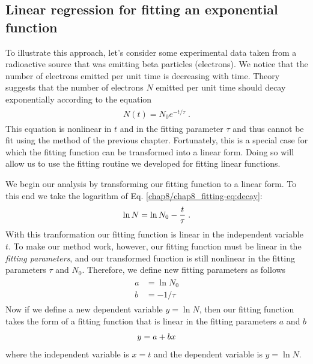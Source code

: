 \documentclass[letterpaper,10pt,english]{sphinxmanual}
\begin{document}
\subsection{Linear regression for fitting an exponential function}
\label{chap8/chap8_fitting:linear-regression-for-fitting-an-exponential-function}\label{chap8/chap8_fitting:index-1}
To illustrate this approach, let's consider some experimental data taken from a radioactive source that was emitting beta particles (electrons).  We notice that the number of electrons emitted per unit time is decreasing with time.  Theory suggests that the number of electrons $N$ emitted per unit time should decay exponentially according to the equation
\label{chap8/chap8_fitting:equation-eq:decay}\begin{gather}
\begin{split}N(t) = N_0 e^{-t/\tau} \;.\end{split}\label{chap8/chap8_fitting-eq:decay}
\end{gather}
This equation is nonlinear in $t$ and in the fitting parameter $\tau$ and thus cannot be fit using the method of the previous chapter.  Fortunately, this is a special case for which the fitting function can be transformed into a linear form.  Doing so will allow us to use the fitting routine we developed for fitting linear functions.

We begin our analysis by transforming our fitting function to a linear form.  To this end we take the logarithm of Eq. \eqref{chap8/chap8_fitting-eq:decay}:
\begin{gather}
\begin{split}\ln N = \ln N_{0} -\frac{t}{\tau} \;.\end{split}\notag
\end{gather}
With this tranformation our fitting function is linear in the independent variable $t$.  To make our method work, however, our fitting function must be linear in the \emph{fitting parameters}, and our transformed function is still nonlinear in the fitting parameters $\tau$ and $N_0$.  Therefore, we define new fitting parameters as follows
\label{chap8/chap8_fitting:equation-eq:eq15}\begin{gather}
\begin{split}a &= \ln N_{0}\\
b &= -1/\tau\end{split}\label{chap8/chap8_fitting-eq:eq15}
\end{gather}
Now if we define a new dependent variable $y = \ln N$, then our fitting function takes the form of a fitting function that is linear in the fitting parameters $a$ and $b$
\begin{gather}
\begin{split}y = a + bx\end{split}\notag
\end{gather}
where the independent variable is $x=t$ and the dependent variable is $y=\ln N$.
\end{document}
